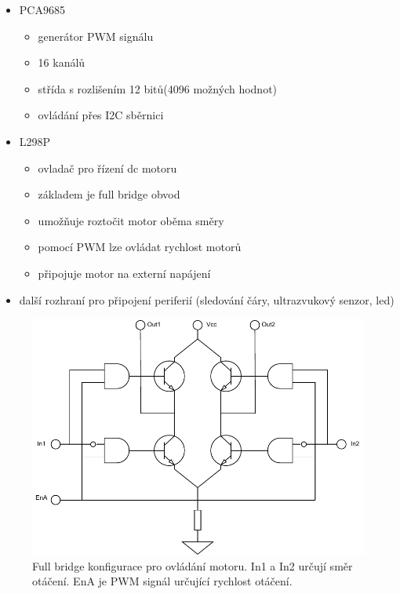 \begin{itemize}
	\item{PCA9685 \cite{pca9685}}
	\begin{itemize}
		\item{generátor PWM signálu}
		\item{16 kanálů}
		\item{střída s rozlišením 12 bitů(4096 možných hodnot)}
		\item{ovládání přes I2C sběrnici}
	\end{itemize}
	\item{L298P \cite{l298}}
	\begin{itemize}
		\item{ovladač pro řízení dc motoru}
		\item{základem je full bridge obvod}
		\item{umožňuje roztočit motor oběma směry}
		\item{pomocí PWM lze ovládat rychlost motorů}
		\item{připojuje motor na externí napájení}
	\end{itemize}
	\item{další rozhraní pro připojení periferií (sledování čáry, ultrazvukový senzor, led)}
\end{itemize}

\begin{figure}[h!]
	\centering
	\includegraphics[scale=0.75]{obrazky-figures/motor_full_bridge.pdf}
	\caption[Full bridge ovladač motoru.]{Full bridge konfigurace pro ovládání motoru. In1 a In2 určují směr otáčení. EnA je PWM signál určující rychlost otáčení. \cite{l298}}
	\label{}
\end{figure}

